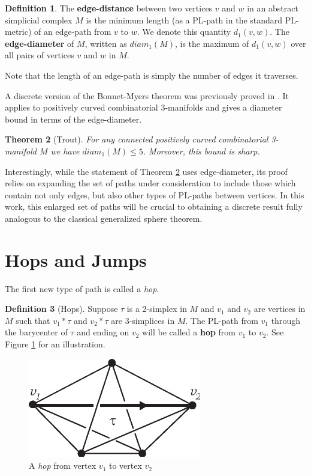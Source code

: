 \documentclass[12pt]{article}
\theoremstyle{plain}
\newtheorem{theorem}{Theorem}
\theoremstyle{definition}
\newtheorem{definition}[theorem]{Definition}
\theoremstyle{remark}
\begin{document}
\begin{definition}The \textbf{edge-distance} between two vertices $v$ and $w$ in an abstract simplicial complex $M$ is the minimum length (as a PL-path in the standard PL-metric) of an edge-path from $v$ to $w$. We denote this quantity $d_1(v,w)$. The \textbf{edge-diameter} of $M$, written as $diam_1(M)$, is the maximum of $d_1(v,w)$ over all pairs of vertices $v$ and $w$ in $M$. 
\end{definition}

\noindent Note that the length of an edge-path is simply the number of edges it traverses.

A discrete version of the Bonnet-Myers theorem was previously proved in \cite{Trout10}. It applies to positively curved combinatorial 3-manifolds and gives a diameter bound in terms of the edge-diameter.

\begin{theorem}[Trout] For any connected positively curved combinatorial 3-manifold $M$ we have $diam_1(M)\leq 5$. Moreover, this bound is sharp.
\label{thm:discrete_BM}
\end{theorem}

\noindent Interestingly, while the statement of Theorem \ref{thm:discrete_BM} uses edge-diameter, its proof relies on expanding the set of paths under consideration to include those which contain not only edges, but also other types of PL-paths between vertices. In this work, this enlarged set of paths will be crucial to obtaining a discrete result fully analogous to the classical generalized sphere theorem.

\section{Hops and Jumps}
The first new type of path is called a {\em hop}.

\begin{definition}[Hops] Suppose $\tau$ is a 2-simplex in $M$ and $v_1$ and $v_2$ are vertices in $M$ such that $v_1*\tau$ and $v_2*\tau$ are 3-simplices in $M$. The PL-path from $v_1$ through the barycenter of $\tau$ and ending on $v_2$ will be called a \textbf{hop} from $v_1$ to $v_2$. See Figure \ref{fig:hop} for an illustration.
\end{definition}

\begin{figure}
	\centering
		\includegraphics[width=0.28\linewidth]{figures/hops.pdf}
    \caption{A {\em hop} from vertex $v_1$ to vertex $v_2$}
    	\label{fig:hop}
\end{figure}
\end{document}

